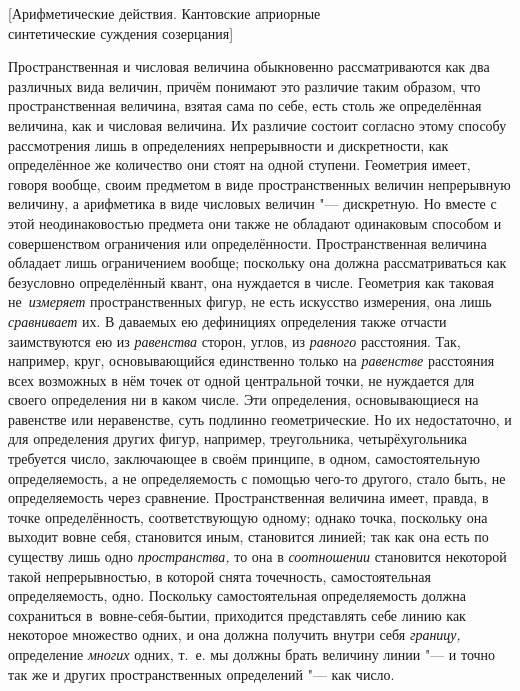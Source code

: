 %
{[Арифметические действия. Кантовские априорные\\
синтетические суждения созерцания]}

Пространственная и числовая величина обыкновенно рассматриваются как два
различных вида величин, причём понимают это различие таким образом, что
пространственная величина, взятая сама по себе, есть столь же определённая
величина, как и числовая величина. Их различие состоит согласно этому способу
рассмотрения лишь в определениях непрерывности и дискретности, как определённое
же количество они стоят на одной ступени. Геометрия имеет, говоря вообще, своим
предметом в виде пространственных величин непрерывную величину, а арифметика в
виде числовых величин "--- дискретную. Но вместе с этой неодинаковостью
предмета они также не обладают одинаковым способом и совершенством ограничения
или определённости. Пространственная величина обладает лишь ограничением
вообще; поскольку она должна рассматриваться как безусловно определённый
квант, она нуждается в числе. Геометрия как таковая не~{\em измеряет}
пространственных фигур, не есть искусство измерения, она лишь {\em сравнивает}
их. В даваемых ею дефинициях определения также отчасти заимствуются ею из
{\em равенства} сторон, углов, из {\em равного} расстояния. Так, например,
круг, основывающийся единственно только на {\em равенстве} расстояния всех
возможных в нём точек от одной центральной точки, не нуждается для своего
определения ни в каком числе. Эти определения, основывающиеся на равенстве или
неравенстве, суть подлинно геометрические. Но их недостаточно, и для
определения других фигур, например, треугольника, четырёхугольника требуется
число, заключающее в своём принципе, в одном, самостоятельную определяемость,
а не определяемость с помощью чего-то другого, стало быть, не определяемость
через сравнение. Пространственная величина имеет, правда, в точке
определённость, соответствующую одному; однако точка, поскольку она выходит вовне
себя, становится иным, становится линией; так как она есть по существу
лишь одно {\em пространства,} то она в {\em соотношении} становится некоторой
такой непрерывностью, в которой снята точечность, самостоятельная
определяемость, одно. Поскольку самостоятельная определяемость должна
сохраниться в~вовне-себя-бытии, приходится представлять себе линию как некоторое
множество одних, и она должна получить внутри себя {\em границу,} определение
{\em многих} одних, т.~е. мы должны брать величину линии "--- и точно так же и
других пространственных определений "--- как число.

